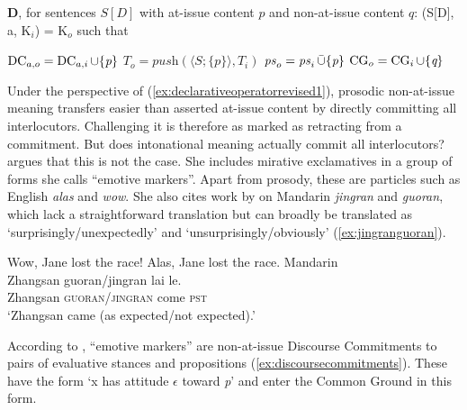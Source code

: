 \begin{exe}
\ex\label{ex:declarativeoperatorrevised1}\textbf{D}, for sentences $S[D]$ with at-issue content $p$ and non-at-issue content $q$:
(S[D], a, K$_{i}$) = K$_{o}$ such that
\begin{xlist}
	\ex $\operatorname{DC}_{a,o} = \operatorname{DC}_{a,i}\cup\{\textit{p}\}$ 
	\ex $T_{o} = \textit{push}(\langle S; \lbrace p \rbrace\rangle, T_{i})$
	\ex $\operatorname{\text{\textit{ps}}}_{o} = \operatorname{\text{\textit{ps}}}_{i}\bar{\cup}\{\textit{p}\}$ 
	\ex $\operatorname{CG}_{o} = \operatorname{CG}_{i} \cup \{\textit{q}\}$ 
\end{xlist}
\end{exe}

Under the perspective of (\ref{ex:declarativeoperatorrevised1}), prosodic non-at-issue meaning transfers easier than asserted at-issue content by directly committing all interlocutors. Challenging it is therefore as marked as retracting from a commitment. But does intonational meaning actually commit all interlocutors? \citet{Rett.2021emotivemarkers} argues that this is not the case. She includes mirative exclamatives in a group of forms she calls “emotive markers”. Apart from prosody, these are particles such as English \textit{alas} and \textit{wow}. She also cites work by \citet{Wu.2008} on Mandarin \textit{jingran} and \textit{guoran}, which lack a straightforward translation but can broadly be translated as `surprisingly/unexpectedly' and `unsurprisingly/obviously' (\ref{ex:jingranguoran}). 

\begin{exe} 
	\ex \label{ex:jingranguoran}
	\begin{xlist}
		\ex Wow, Jane lost the race! 
		\ex Alas, Jane lost the race.
		\ex Mandarin\\
			\gll Zhangsan guoran/jingran lai le.\\
			     Zhangsan \textsc{guoran}/\textsc{jingran} come \textsc{pst} \\
			\glt `Zhangsan came (as expected/not expected).'
	\end{xlist}
\end{exe}

According to \citet[326]{Rett.2021emotivemarkers}, ``emotive markers'' are non-at-issue Discourse Commitments to pairs of evaluative stances and propositions (\ref{ex:discoursecommitments}). These have the form `x has attitude $\epsilon$ toward \textit{p}' and enter the Common Ground in this form.

